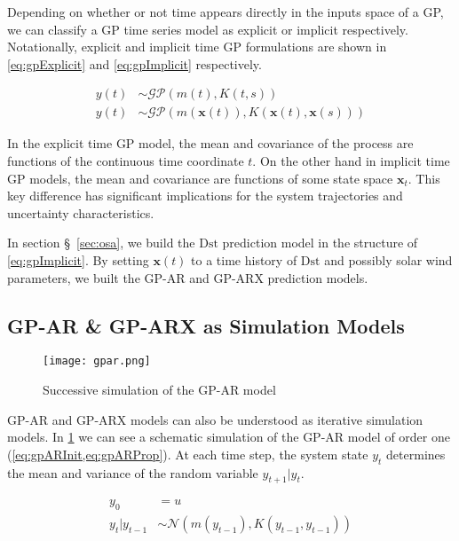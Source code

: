 Depending on whether or not time appears directly in the inputs space of a GP, we can classify a GP time series model as explicit or 
implicit respectively. Notationally, explicit and implicit time GP formulations are shown in \cref{eq:gpExplicit} and \cref{eq:gpImplicit} respectively.

\begin{align}
    y(t) &\sim \mathcal{GP}(m(t), K(t, s)) \label{eq:gpExplicit}\\
    y(t) &\sim \mathcal{GP}(m(\mathbf{x}(t)), K(\mathbf{x}(t), \mathbf{x}(s))) \label{eq:gpImplicit}
\end{align}

In the explicit time GP model, the mean and covariance of the process are functions of the continuous time coordinate $t$. On the other hand 
in implicit time GP models, the mean and covariance are functions of some state space $\mathbf{x}_t$. This key difference has significant 
implications for the system trajectories and uncertainty characteristics.

In section \S~\ref{sec:osa}, we build the $\mathrm{Dst}$ prediction model in the structure of \cref{eq:gpImplicit}. By setting $\mathbf{x}(t)$ to 
a time history of $\mathrm{Dst}$ and possibly solar wind parameters, we built the GP-AR and GP-ARX prediction models.

\subsection*{GP-AR \& GP-ARX as Simulation Models}

\begin{figure}
    \centering
    \noindent\texttt{[image: gpar.png]}
    \caption{Successive simulation of the GP-AR model}
    \label{fig:gparDiag}
\end{figure}

GP-AR and GP-ARX models can also be understood as iterative simulation models. In \cref{fig:gparDiag} we can see a schematic 
simulation of the GP-AR model of order one (\cref{eq:gpARInit,eq:gpARProp}). At each time step, the system state $y_t$ determines 
the mean and variance of the random variable $y_{t+1} \rvert y_t$.

\begin{align}
    y_0 &= u \label{eq:gpARInit}\\
    y_t \rvert y_{t-1} &\sim \mathcal{N}(m(y_{t - 1}), K(y_{t - 1}, y_{t - 1})) \label{eq:gpARProp}
\end{align}

